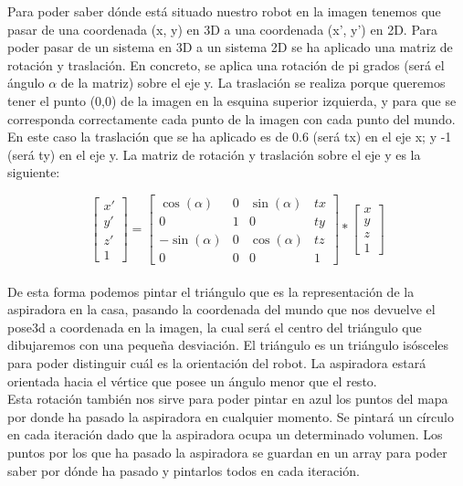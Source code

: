 Para poder saber dónde está situado nuestro robot en la imagen tenemos que pasar de una coordenada (x, y) en 3D a una coordenada (x’, y’) en 2D. Para poder pasar de un sistema en 3D a un sistema 2D se ha aplicado una matriz de rotación y traslación. En concreto, se aplica una rotación de pi grados (será el ángulo \(\alpha\) de la matriz) sobre el eje y. La traslación se realiza porque queremos tener el punto (0,0) de la imagen en la esquina superior izquierda, y para que se corresponda correctamente cada punto de la imagen con cada punto del mundo. En este caso la traslación que se ha aplicado es de 0.6 (será tx) en el eje x; y -1 (será ty) en el eje y. La matriz de rotación y traslación sobre el eje y es la siguiente:


\begin{equation}
\left[\begin{array}{cc}
x' \\ 
y' \\
z' \\
1
\end{array}\right] = \left[\begin{array}{cccc}
\cos(\alpha) & 0 & \sin(\alpha) & tx \\ 
0 & 1 & 0 & ty\\
-\sin(\alpha) & 0 & \cos(\alpha) & tz \\
0 & 0 & 0 & 1
\end{array}\right]* \left[\begin{array}{cc}
x \\ 
y \\
z \\
1
\end{array}\right]
\end{equation}
\\

De esta forma podemos pintar el triángulo que es la representación de la aspiradora en la casa, pasando la coordenada del mundo que nos devuelve el pose3d a coordenada en la imagen, la cual será el centro del triángulo que dibujaremos con una pequeña desviación. El triángulo es un triángulo isósceles para poder distinguir cuál es la orientación del robot. La aspiradora estará orientada hacia el vértice que posee un ángulo menor que el resto.\\

Esta rotación también nos sirve para poder pintar en azul los puntos del mapa por donde ha pasado la aspiradora en cualquier momento. Se pintará un círculo en cada iteración dado que la aspiradora ocupa un determinado volumen. Los puntos por los que ha pasado la aspiradora se guardan en un array para poder saber por dónde ha pasado y pintarlos todos en cada iteración.\\

